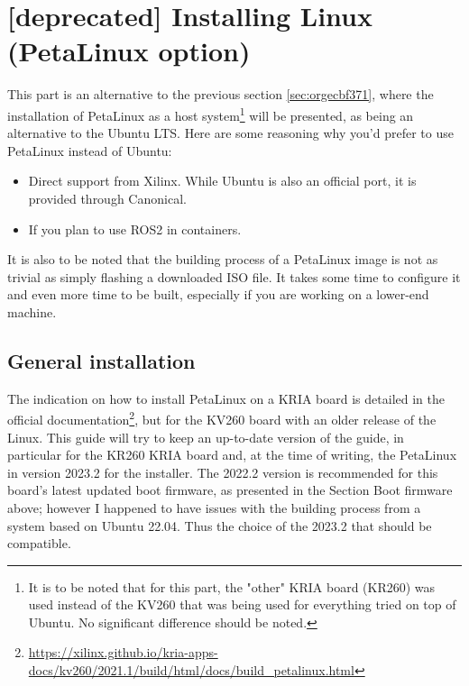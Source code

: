 \documentclass[10pt]{article}
\begin{document}
\section{[deprecated] Installing Linux (PetaLinux option)}
\label{sec:orge690d20}
This part is an alternative to the previous section \ref{sec:orgecbf371},
where the installation of PetaLinux as a host system\footnote{It is to be noted that for this part, the "other" KRIA board (KR260) was
used instead of the KV260 that was being used for everything tried on top of
Ubuntu. No significant difference should be noted.\label{orgf488366}} will be presented,
as being an alternative to the Ubuntu LTS. Here are some reasoning why you'd
prefer to use PetaLinux instead of Ubuntu:
\begin{itemize}
\item Direct support from Xilinx. While Ubuntu is also an official port, it is
provided through Canonical.
\item If you plan to use ROS2 in containers.
\end{itemize}

It is also to be noted that the building process of a PetaLinux image is not as
trivial as simply flashing a downloaded ISO file. It takes some time to
configure it and even more time to be built, especially if you are working on a
lower-end machine.

\subsection{General installation}
\label{sec:org864fb10}
The indication on how to install PetaLinux on a KRIA board is detailed in the
official documentation\footnote{\url{https://xilinx.github.io/kria-apps-docs/kv260/2021.1/build/html/docs/build\_petalinux.html}\label{org00f24a3}}, but for the KV260 board with an older release of
the Linux. This guide will try to keep an up-to-date version of the guide, in
particular for the KR260 KRIA board and, at the time of writing, the PetaLinux
in version 2023.2 for the installer.  The 2022.2 version is recommended for this
board's latest updated boot firmware, as presented in the Section Boot firmware
above; however I happened to have issues with the building process from a system
based on Ubuntu 22.04. Thus the choice of the 2023.2 that should be compatible.
\end{document}
